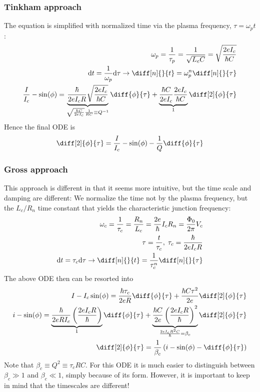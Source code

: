 \documentclass[reprint,onecolumn,%
amsmath,amssymb,aip,apl]{revtex4-1}
\begin{document}
	
	\subsubsection{Tinkham approach}
	The equation is simplified with normalized time via the plasma frequency, $\tau=\omega_p t$:
	\begin{eqnarray}
	\omega_p=\frac{1}{\tau_p}=\frac{1}{\sqrt{L_c C}}=\sqrt{\frac{2eI_c}{\hbar C}} \\%
	{\rm d}t=\frac{1}{\omega_p}{\rm d}\tau \rightarrow \diff[n]{}{t}=\omega_p^n \diff[n]{}{\tau} \\%
	\frac{I}{I_c}-\sin(\phi) = \underbrace{\frac{\hbar}{2eI_cR}\sqrt{\frac{2eI_c}{\hbar C}}}_{\sqrt{\frac{\hbar C}{2eI_c}}\frac{1}{RC}\equiv Q^{-1}}\diff{\phi}{\tau}+\underbrace{\frac{\hbar C}{2eI_c}\frac{2eI_c}{\hbar C}}_{1}\diff[2]{\phi}{\tau}
	\end{eqnarray}
	Hence the final ODE is
	\begin{eqnarray}
	\diff[2]{\phi}{\tau}=\frac{I}{I_c}-\sin(\phi)-\frac{1}{Q}\diff{\phi}{\tau}
	\label{eq:tinkham}
	\end{eqnarray}
	
	\subsubsection{Gross approach}
	This approach is different in that it seems more intuitive, but the time scale and damping are different:
	We normalize the time not by the plasma frequency, but the $L_c/R_n$ time constant that yields the characteristic junction frequency:
	\begin{eqnarray}
	\omega_c=\frac{1}{\tau_c}=\frac{R_n}{L_c}=\frac{2e}{\hbar}I_cR_n=\frac{\Phi_0}{2\pi}V_c \\%
	\tau=\frac{t}{\tau_c}, \; \tau_c=\frac{\hbar}{2e I_cR} \\%
	{\rm d}t=\tau_c{\rm d}\tau \rightarrow \diff[n]{}{t}=\frac{1}{\tau_c^{n}}\diff[n]{}{\tau}
	\end{eqnarray}
	The above ODE then can be resorted into
	\begin{eqnarray}
	I-I_c\sin(\phi)=\frac{\hbar\tau_c}{2eR}\diff{\phi}{\tau}+\frac{\hbar C \tau^2}{2e}\diff[2]{\phi}{\tau} \\%
	i-\sin(\phi)=\underbrace{\frac{\hbar}{2eRI_c}\left(\frac{2eI_cR}{\hbar}\right)}_{1}\diff{\phi}{\tau}+\underbrace{\frac{\hbar C}{2e}\left(\frac{2eI_cR}{\hbar}\right)^2}_{\frac{2eI_cR^2C}{\hbar}=\beta_c} \diff[2]{\phi}{\tau} \\%
	\diff[2]{\phi}{\tau} = \frac{1}{\beta_c}\left(i-\sin(\phi)-\diff{\phi}{\tau}\right)
	\label{eq:gross}
	\end{eqnarray}
	Note that $\beta_c\equiv Q^2\equiv\tau_c RC$.
	For this ODE it is much easier to distinguish between $\beta_c\gg1$ and $\beta_c\ll1$, simply because of its form.
	However, it is important to keep in mind that the timescales are different!
	
\end{document}

